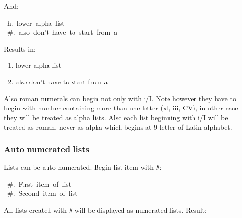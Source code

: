 \documentclass[12pt]{article}
\newcommand{\sups}[1]{\raisebox{0.7ex}{\footnotesize #1}}
\begin{document}
And:

\begin{ttfamily}\begin{flushleft}
\mbox{~h.~lower~alpha~list}\\
\mbox{~\#.~also~don't~have~to~start~from~a}\\
\end{flushleft}\end{ttfamily}

Results in:

\begin{enumerate}[label=\alph*.,start=8]
\item
lower alpha list

\item
also don't have to start from a
\end{enumerate}

Also roman numerals can begin not only with i/I. Note however they have to
begin with number containing more than one letter (xl, iii, CV), in other case
they will be treated as alpha lists. Also each list beginning with i/I will be
treated as roman, never as alpha which begins at 9\sups{th} letter of Latin
alphabet.

\begin{center}
\end{center}
\hypertarget{lauto-numerated-lists}{}
\subsubsection{Auto numerated lists}

Lists can be auto numerated. Begin list item with \texttt{\#}:

\begin{ttfamily}\begin{flushleft}
\mbox{~\#.~First~item~of~list}\\
\mbox{~\#.~Second~item~of~list}\\
\end{flushleft}\end{ttfamily}

All lists created with \texttt{\#} will be displayed as numerated lists. Result:
\end{document}
